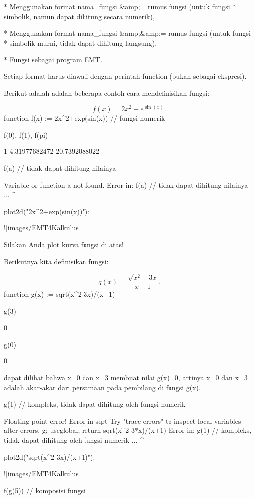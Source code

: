 \documentclass{article}
\begin{document}
* 
Menggunakan format nama_fungsi &amp;= rumus fungsi (untuk fungsi
* simbolik, namun dapat dihitung secara numerik),

* 
Menggunakan format nama_fungsi &amp;&amp;= rumus fungsi (untuk fungsi
* simbolik murni, tidak dapat dihitung langsung),

* 
Fungsi sebagai program EMT.


Setiap format harus diawali dengan perintah function (bukan sebagai
ekspresi).


Berikut adalah adalah beberapa contoh cara mendefinisikan fungsi:


$$f(x)=2x^2+e^{\sin(x)}.$$\>function f(x) := 2\*x^2+exp(sin(x)) // fungsi numerik

\>f(0), f(1), f(pi)


    1
    4.31977682472
    20.7392088022

\>f(a) // tidak dapat dihitung nilainya


    Variable or function a not found.
    Error in:
    f(a) // tidak dapat dihitung nilainya ...
       ^

\>plot2d("2\*x^2+exp(sin(x))"):


![images/EMT4Kalkulus%

Silakan Anda plot kurva fungsi di atas!


Berikutnya kita definisikan fungsi:


$$g(x)=\frac{\sqrt{x^2-3x}}{x+1}.$$\>function g(x) := sqrt(x^2-3\*x)/(x+1)

\>g(3)


    0

\>g(0)


    0

dapat dilihat bahwa x=0 dan x=3 membuat nilai g(x)=0, artinya x=0 dan
x=3 adalah akar-akar dari persamaan pada pembilang di fungsi g(x).


\>g(1) // kompleks, tidak dapat dihitung oleh fungsi numerik


    Floating point error!
    Error in sqrt
    Try "trace errors" to inspect local variables after errors.
    g:
        useglobal; return sqrt(x^2-3*x)/(x+1) 
    Error in:
    g(1) // kompleks, tidak dapat dihitung oleh fungsi numerik ...
        ^

\>plot2d("sqrt(x^2-3\*x)/(x+1)"):


![images/EMT4Kalkulus%

\>f(g(5)) // komposisi fungsi
\end{document}
